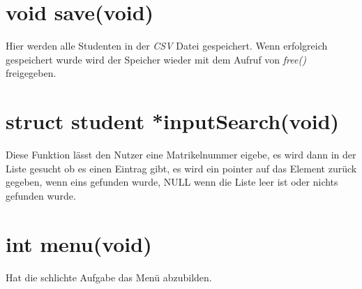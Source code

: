 \documentclass[a4paper, 11pt, oneside]{book} %
\begin{document}
\section{void save(void)}
Hier werden alle Studenten in der \textit{CSV} Datei gespeichert. Wenn erfolgreich gespeichert wurde wird der Speicher wieder mit dem Aufruf von \textit{free()} freigegeben.

\section{struct student *inputSearch(void)}
Diese Funktion lässt den Nutzer eine Matrikelnummer eigebe, es wird dann in der Liste gesucht ob es einen Eintrag gibt, es wird ein pointer auf das Element zurück gegeben, wenn eins gefunden wurde, NULL wenn die Liste leer ist oder nichts gefunden wurde.


\section{int menu(void)}
Hat die schlichte Aufgabe das Menü abzubilden.
\end{document}
